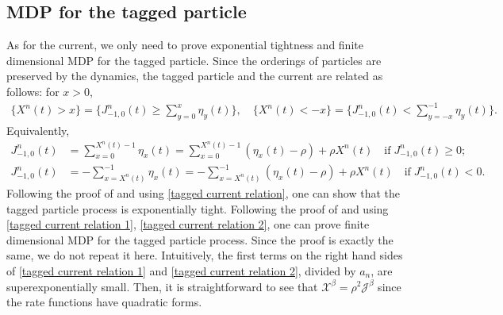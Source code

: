 \documentclass[reqno,11pt]{amsart}
\numberwithin{equation}{section}
\begin{document}
\subsection{MDP for the tagged particle}\label{subsec:tagged} As for the current, we only need to prove exponential tightness and finite dimensional MDP for the tagged particle. Since the orderings of particles are preserved by the dynamics, the tagged particle and the current are related as follows: for $x > 0$, 
\begin{align}\label{tagged current relation}
 \{X^n (t) > x\} = \Big\{J^n_{-1,0} (t) \geq \sum_{y=0}^{x} \eta_y (t) \Big\},  \quad \{X^n (t) < -x\} = \Big\{J^n_{-1,0} (t) <  \sum_{y=-x}^{-1} \eta_{y} (t) \Big\}.
\end{align}
Equivalently, 
\begin{align}
J^n_{-1,0} (t) &= \sum_{x=0}^{X^n(t)-1} \eta_x (t) = \sum_{x=0}^{X^n(t)-1} (\eta_x (t) -\rho) + \rho X^n(t) \quad \text{if}\; J^n_{-1,0} (t) \geq 0;\label{tagged current relation 1}\\
J^n_{-1,0} (t) &= -\sum_{x=X^n(t)}^{-1} \eta_x (t) = - \sum_{x=X^n(t)}^{-1} (\eta_x (t) -\rho) + \rho X^n(t) \quad \text{if}\; J^n_{-1,0} (t) < 0.\label{tagged current relation 2}
\end{align}
Following the proof of \cite[Lemma 5.3]{xue2024sample} and using \eqref{tagged current relation}, one can show that the tagged particle process is exponentially tight. Following the proof of \cite[Lemma 6.2]{xue2024sample} and using \eqref{tagged current relation 1}, \eqref{tagged current relation 2}, one can prove finite dimensional MDP for the tagged particle process. Since the proof is exactly the same, we do not repeat it here. Intuitively, the first terms on the right hand sides of \eqref{tagged current relation 1} and \eqref{tagged current relation 2}, divided by $a_n$, are superexponentially small.  Then, it is straightforward to see that $\mathcal{X}^\beta = \rho^2 \mathcal{J}^\beta$ since the rate functions have quadratic forms. 






\appendix
\end{document}
